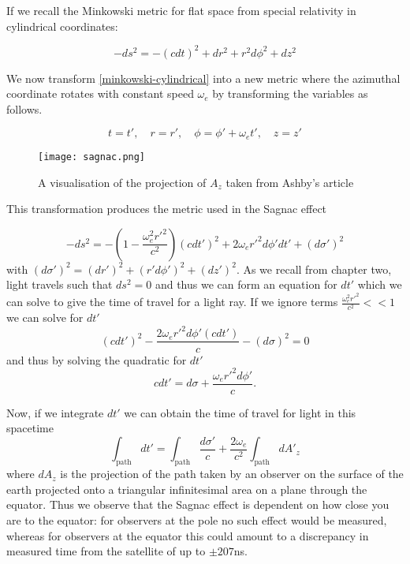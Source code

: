 If we recall the Minkowski metric for flat space from special relativity in cylindrical coordinates: 

\begin{equation} \label{minkowski-cylindrical} 
	-ds^2 = -(c dt)^2 + dr^2 + r^2 d\phi^2 + dz^2
\end{equation}

We now transform \eqref{minkowski-cylindrical} into a new metric where the azimuthal coordinate rotates with constant speed \(\omega_{e}\) by transforming the variables as follows. 

\begin{equation} \label{minkowski-cylindrical-transform}
	t = t' , \,\,\,\,\,\, r=r', \,\,\,\,\,\, \phi = \phi' + \omega_{e} t', \,\,\,\,\,\, z = z'
\end{equation}

\begin{figure}[h]
\centering
\texttt{[image: sagnac.png]}
\caption{A visualisation of the projection of $A_z$ taken from Ashby's article \cite{ashby2}}
\end{figure}

This transformation produces the metric used in the Sagnac effect \cite{ashby-llr}

\begin{equation} \label{sagnac-metric}
-ds^2 = - \left(1- \frac{\omega_{e}^2 {r'}^2}{c^2}\right)(cdt')^2 + 2 \omega_{e} {r'}^2 d\phi' dt' + (d\sigma')^2
\end{equation}
with $(d\sigma')^2 = (dr')^2 + (r' d \phi')^2 + (dz')^2$. As we recall from chapter two, light travels such that \(ds^2 = 0\) and thus we can form an equation for \(dt'\) which we can solve to give the time of travel for a light ray. If we ignore terms $\frac{\omega_{e}^2 {r'}^2}{c^2} << 1$ we can solve for $dt'$ 
\begin{equation} \label{sagnac-deriv}
	(cdt')^2 - \frac{2\omega_{e} {r'}^2 d\phi' (cdt')}{c} - (d \sigma)^2 = 0
\end{equation}
and thus by solving the quadratic for \(dt'\)
\begin{equation} \label{sagnac-deriv2}
	c dt' = d\sigma + \frac{\omega_{e} {r'}^2 d\phi'}{c} .
\end{equation}

Now, if we integrate \(dt'\) we can obtain the time of travel for light in this spacetime
\begin{equation}
	\int_{\text{path}} dt' = \int_{\text{path}} \frac{d \sigma'}{c} + \frac{2\omega_{e}}{c^2} \int_{\text{path}} d {A'}_{z}
\end{equation}
\noindent where $dA_z$ is the projection of the path taken by an observer on the surface of the earth projected onto a triangular infinitesimal area on a plane through the equator. Thus we observe that the Sagnac effect is dependent on how close you are to the equator: for observers at the pole no such effect would be measured, whereas for observers at the equator this could amount to a discrepancy in measured time from the satellite of up to $\pm 207 $ns. 

